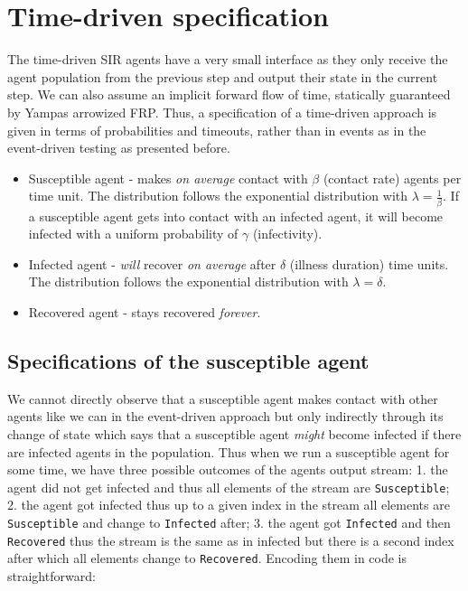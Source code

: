 \section{Time-driven specification}
\label{sec:timedriven_specification}
The time-driven SIR agents have a very small interface as they only receive the agent population from the previous step and output their state in the current step. We can also assume an implicit forward flow of time, statically guaranteed by Yampas arrowized FRP. Thus, a specification of a time-driven approach is given in terms of probabilities and timeouts, rather than in events as in the event-driven testing as presented before.

\begin{itemize}
	\item Susceptible agent - makes \textit{on average} contact with $\beta$ (contact rate) agents per time unit. The distribution follows the exponential distribution with $\lambda = \frac{1}{\beta}$. If a susceptible agent gets into contact with an infected agent, it will become infected with a uniform probability of $\gamma$ (infectivity).
	
	\item Infected agent - \textit{will} recover \textit{on average} after $\delta$ (illness duration) time units. The distribution follows the exponential distribution with $\lambda = \delta$.

	\item Recovered agent - stays recovered \textit{forever}.
\end{itemize}

\subsection{Specifications of the susceptible agent}
We cannot directly observe that a susceptible agent makes contact with other agents like we can in the event-driven approach but only indirectly through its change of state which says that a susceptible agent \textit{might} become infected if there are infected agents in the population.
Thus when we run a susceptible agent for some time, we have three possible outcomes of the agents output stream: 1. the agent did not get infected and thus all elements of the stream are \texttt{Susceptible}; 2. the agent got infected thus up to a given index in the stream all elements are \texttt{Susceptible} and change to \texttt{Infected} after; 3. the agent got \texttt{Infected} and then \texttt{Recovered} thus the stream is the same as in infected but there is a second index after which all elements change to \texttt{Recovered}. Encoding them in code is straightforward:

